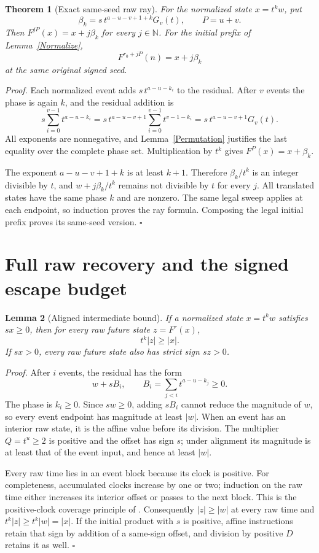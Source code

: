 \documentclass[11pt,letterpaper]{article}
\newcommand{\N}{\mathbb{N}}
\newtheorem{theorem}{Theorem}
\newtheorem{lemma}[theorem]{Lemma}
\newenvironment{proof}{\noindent\textit{Proof.}}{\hfill\(\square\)}
\begin{document}
\begin{theorem}[Exact same-seed raw ray]\label{Ray}
For the normalized state \(x=t^k w\), put
\[
\beta_k=s\,t^{a-u-v+1+k}G_v(t),\qquad P=u+v.
\]
Then \(F^{jP}(x)=x+j\beta_k\) for every \(j\in\N\).
For the initial prefix of Lemma~\ref{Normalize},
\[
F^{r_0+jP}(n)=x+j\beta_k
\]
at the same original signed seed.
\end{theorem}
\begin{proof}
Each normalized event adds \(s\,t^{a-u-k_i}\) to the residual.
After \(v\) events the phase is again \(k\), and the residual addition is
\[
s\sum_{i=0}^{v-1}t^{a-u-k_i}
=s\,t^{a-u-v+1}\sum_{i=0}^{v-1}t^{v-1-k_i}
=s\,t^{a-u-v+1}G_v(t).
\]
All exponents are nonnegative, and Lemma~\ref{Permutation} justifies the
last equality over the complete phase set. Multiplication by \(t^k\)
gives \(F^P(x)=x+\beta_k\).

The exponent \(a-u-v+1+k\) is at least \(k+1\). Therefore
\(\beta_k/t^k\) is an integer divisible by \(t\), and
\(w+j\beta_k/t^k\) remains not divisible by \(t\) for every \(j\).
All translated states have the same phase \(k\) and are nonzero.
The same legal sweep applies at each endpoint, so induction proves the
ray formula. Composing the legal initial prefix proves its same-seed version.
\end{proof}

\section{Full raw recovery and the signed escape budget}

\begin{lemma}[Aligned intermediate bound]\label{Aligned}
If a normalized state \(x=t^k w\) satisfies \(sx\ge0\), then for every
raw future state \(z=F^r(x)\),
\[
t^k|z|\ge|x|.
\]
If \(sx>0\), every raw future state also has strict sign \(sz>0\).
\end{lemma}
\begin{proof}
After \(i\) events, the residual has the form
\[
w+sB_i,\qquad
B_i=\sum_{j<i}t^{a-u-k_j}\ge0.
\]
The phase is \(k_i\ge0\). Since \(sw\ge0\), adding \(sB_i\) cannot reduce
the magnitude of \(w\), so every event endpoint has magnitude at least
\(|w|\). When an event has an interior raw state, it is the affine value
before its division. The multiplier \(Q=t^u\ge2\) is positive and the
offset has sign \(s\); under alignment its magnitude is at least that
of the event input, and hence at least \(|w|\).

Every raw time lies in an event block because its clock is positive.
For completeness, accumulated clocks increase by one or two; induction on
the raw time either increases its interior offset or passes to the next block.
This is the positive-clock coverage principle of \cite{AscendCompressionII}.
Consequently \(|z|\ge|w|\) at every raw time and
\(t^k|z|\ge t^k|w|=|x|\). If the initial product with \(s\) is positive,
affine instructions retain that sign by addition of a same-sign offset,
and division by positive \(D\) retains it as well.
\end{proof}
\end{document}
